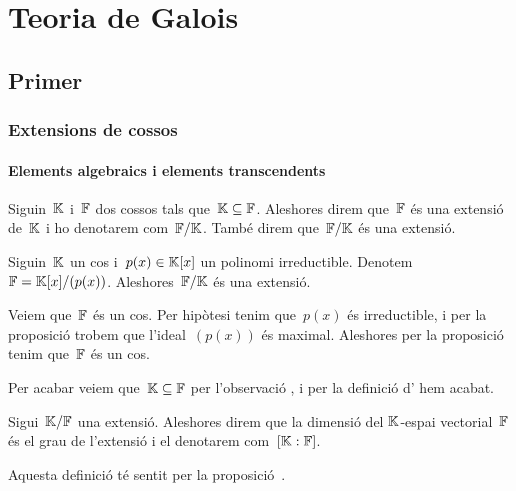 \documentclass[../Apunts.tex]{subfiles}
\begin{document}
\part{Teoria de Galois}
\chapter[Capítol primer]{Primer}
\section{Extensions de cossos}
\subsection{Elements algebraics i elements transcendents}
	\begin{definition}
		\label{def:extensió d'un cos}
		Siguin~\(\mathbb{K}\) i~\(\mathbb{F}\) dos cossos tals que~\(\mathbb{K}\subseteq\mathbb{F}\). Aleshores direm que~\(\mathbb{F}\) és una extensió de~\(\mathbb{K}\) i ho denotarem com~\(\mathbb{F}/\mathbb{K}\). També direm que~\(\mathbb{F}/\mathbb{K}\) és una extensió.
	\end{definition}
	\begin{example}
		\label{ex:el cos de polinomis és una extensió}
		Siguin~\(\mathbb{K}\) un cos i~\(p(x)\in\mathbb{K}[x]\) un polinomi irreductible. Denotem~\(\mathbb{F}=\mathbb{K}[x]/(p(x))\). Aleshores~\(\mathbb{F}/\mathbb{K}\) és una extensió.
		\begin{solution} %
			Veiem que~\(\mathbb{F}\) és un cos. Per hipòtesi tenim que~\(p(x)\) és irreductible, i per la proposició  trobem que l'ideal~\((p(x))\) és maximal. Aleshores per la proposició  tenim que~\(\mathbb{F}\) és un cos.
			
			Per acabar veiem que~\(\mathbb{K}\subseteq\mathbb{F}\) per l'observació , i per la definició d' hem acabat.
		\end{solution}
	\end{example}
	\begin{definition}
		\label{def:grau d'una extensió}
		Sigui~\(\mathbb{K}/\mathbb{F}\) una extensió. Aleshores direm que la dimensió del \(\mathbb{K}\)-espai vectorial~\(\mathbb{F}\) és el grau de l'extensió i el denotarem com~\([\mathbb{K}:\mathbb{F}]\).
		
		Aquesta definició té sentit per la proposició~.
	\end{definition}
\end{document}

